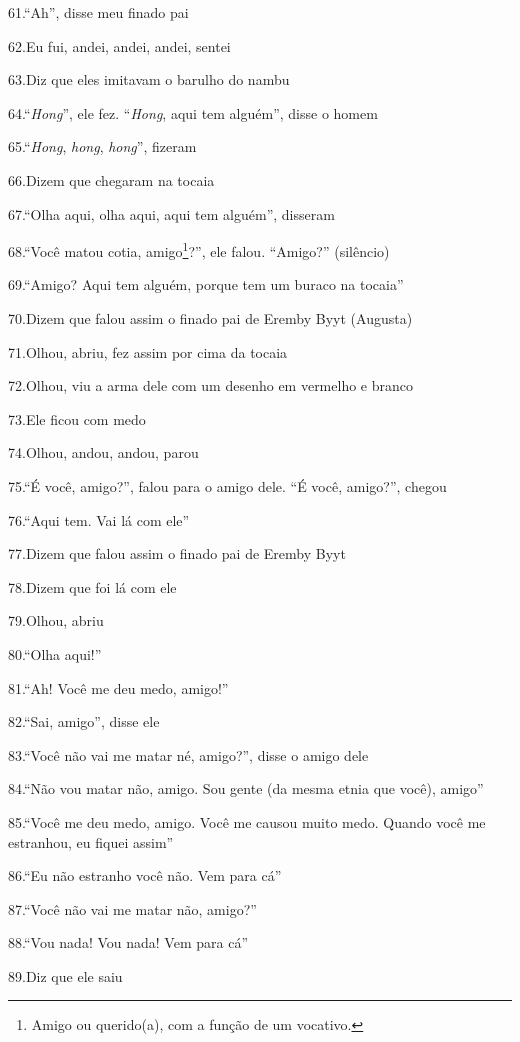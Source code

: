 61.``Ah'', disse meu finado pai

62.Eu fui, andei, andei, andei, sentei

63.Diz que eles imitavam o barulho do nambu

64.``\emph{Hong}'', ele fez. ``\emph{Hong}, aqui tem alguém'', disse o
homem

65.``\emph{Hong}, \emph{hong}, \emph{hong}'', fizeram

66.Dizem que chegaram na tocaia

67.``Olha aqui, olha aqui, aqui tem alguém'', disseram

68.``Você matou cotia, amigo\footnote{Amigo ou querido(a), com a função
  de um vocativo.}?'', ele falou. ``Amigo?'' (silêncio)

69.``Amigo? Aqui tem alguém, porque tem um buraco na tocaia''

70.Dizem que falou assim o finado pai de Eremby Byyt (Augusta)

71.Olhou, abriu, fez assim por cima da tocaia

72.Olhou, viu a arma dele com um desenho em vermelho e branco

73.Ele ficou com medo

74.Olhou, andou, andou, parou

75.``É você, amigo?'', falou para o amigo dele. ``É você, amigo?'',
chegou

76.``Aqui tem. Vai lá com ele''

77.Dizem que falou assim o finado pai de Eremby Byyt

78.Dizem que foi lá com ele

79.Olhou, abriu

80.``Olha aqui!''

81.``Ah! Você me deu medo, amigo!''

82.``Sai, amigo'', disse ele

83.``Você não vai me matar né, amigo?'', disse o amigo dele

84.``Não vou matar não, amigo. Sou gente (da mesma etnia que você),
amigo''

85.``Você me deu medo, amigo. Você me causou muito medo. Quando você me
estranhou, eu fiquei assim''

86.``Eu não estranho você não. Vem para cá''

87.``Você não vai me matar não, amigo?''

88.``Vou nada! Vou nada! Vem para cá''

89.Diz que ele saiu

